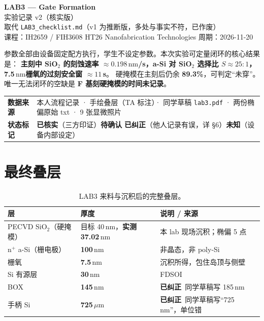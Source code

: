 \documentclass[UTF8,a4paper,11pt,fontset=windows]{ctexart}
\newcommand{\FIXED}{\textcolor{warnred}{\textbf{已纠正}}}
\newcommand{\um}{\ensuremath{\,\mu\mathrm{m}}}
\newcommand{\nm}{\ensuremath{\,\mathrm{nm}}}
\begin{document}
\begin{center}
  {\LARGE\bfseries\color{inkblue} LAB3 --- Gate Formation}\\[4pt]
  {\large 实验记录 v2（核实版）}\\[6pt]
  {\small 取代 \texttt{LAB3\_checklist.md}（v1 为推断版，多处与事实不符，已作废）}\\[2pt]
  {\small 课程：IH2659 / FIH3608 HT26 Nanofabrication Technologies \quad 周期：2026-11-20}
\end{center}

\vspace{-2pt}
\begin{keybox}[本记录的一句话结论]
参数全部由设备固定配方执行，学生不设定参数。本次实验可定量闭环的核心结果是：
\textbf{主刻中 SiO$_2$ 的刻蚀速率 $\approx 0.198\nm$/s，a-Si 对 SiO$_2$ 选择比 $S\approx 25{:}1$，
7.5\nm 栅氧的过刻安全窗 $\approx 11$\,s}。
硬掩模在主刻后仍余 \textbf{89.3\%}，可判定“未穿”。
唯一无法闭环的空缺是 \textbf{F 基刻硬掩模的时间未记录}。
\end{keybox}

\vspace{4pt}
\begin{center}
\small
\begin{tabularx}{\textwidth}{@{}>{\bfseries}l X@{}}
\toprule
数据来源 & 本人流程记录 · 手绘叠层（TA 标注）· 同学草稿 \texttt{lab3.pdf} · 两份椭偏原始 txt · 9 张显微照片 \\
状态标记 & \textcolor{okgreen}{\textbf{已核实}}（三方印证）\quad \textcolor{amber}{\textbf{待确认}} \quad \textcolor{warnred}{\textbf{已纠正}}（他人记录有误，详 §6）\quad \textcolor{amber}{\textbf{未知}}（设备内部设定） \\
\bottomrule
\end{tabularx}
\end{center}

\section{最终叠层}

\begin{table}[h]
\centering
\small
\begin{tabularx}{\textwidth}{@{}>{\raggedright\arraybackslash}p{4.2cm} >{\raggedright\arraybackslash}p{4.4cm} X@{}}
\toprule
\textbf{层} & \textbf{厚度} & \textbf{说明 / 来源} \\
\midrule
PECVD SiO$_2$（硬掩模） & 目标 40\nm，\textbf{实测 37.02\nm} & 本 lab 现场沉积；椭偏 5 点 \\
n$^+$ a-Si（栅电极） & \textbf{100\nm} & 非晶态，非 poly-Si \\
栅氧 & \textbf{7.5\nm} & 沉积所得，包住岛顶与侧壁 \\
Si 有源层 & \textbf{30\nm} & FDSOI \\
BOX & \textbf{145\nm} & \FIXED\ 同学草稿写 185\nm \\
手柄 Si & \textbf{725\um} & \FIXED\ 同学草稿写“725 nm”，单位错 \\
\bottomrule
\end{tabularx}
\caption{LAB3 来料与沉积后的完整叠层。}
\end{table}
\end{document}
